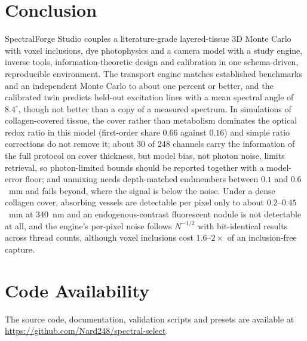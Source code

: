 \documentclass[journal]{IEEEtran}
\begin{document}
\section{Conclusion}
SpectralForge Studio couples a literature-grade layered-tissue 3D Monte Carlo with voxel inclusions, dye photophysics and a camera model with a study engine, inverse tools, information-theoretic design and calibration in one schema-driven, reproducible environment. The transport engine matches established benchmarks and an independent Monte Carlo to about one percent or better, and the calibrated twin predicts held-out excitation lines with a mean spectral angle of $8.4^\circ$, though not better than a copy of a measured spectrum. In simulations of collagen-covered tissue, the cover rather than metabolism dominates the optical redox ratio in this model (first-order share $0.66$ against $0.16$) and simple ratio corrections do not remove it; about 30 of 248 channels carry the information of the full protocol on cover thickness, but model bias, not photon noise, limits retrieval, so photon-limited bounds should be reported together with a model-error floor; and unmixing needs depth-matched endmembers between $0.1$ and $0.6$~mm and fails beyond, where the signal is below the noise. Under a dense collagen cover, absorbing vessels are detectable per pixel only to about $0.2$--$0.45$~mm at 340~nm and an endogenous-contrast fluorescent nodule is not detectable at all, and the engine's per-pixel noise follows $N^{-1/2}$ with bit-identical results across thread counts, although voxel inclusions cost $1.6$--$2\times$ of an inclusion-free capture.

\section*{Code Availability}
The source code, documentation, validation scripts and presets are available at \url{https://github.com/Nard248/spectral-select}.

\balance


\end{document}
